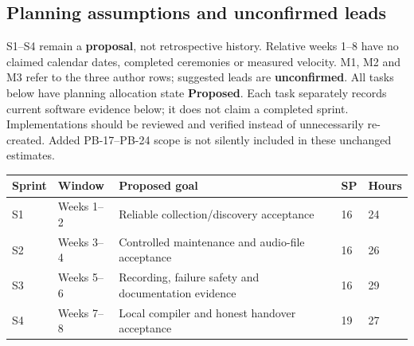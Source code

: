 \documentclass[11pt,a4paper]{article}
\begin{document}
\subsection{Planning assumptions and unconfirmed leads}
S1--S4 remain a \textbf{proposal}, not retrospective history. Relative weeks
1--8 have no claimed calendar dates, completed ceremonies or measured
velocity. M1, M2 and M3 refer to the three author rows;
suggested leads are \textbf{unconfirmed}. All tasks below have planning
allocation state \textbf{Proposed}. Each task separately records current
software evidence below; it does not claim a completed sprint. Implementations should be reviewed and
verified instead of unnecessarily re-created. Added PB-17--PB-24 scope
is not silently included in these unchanged estimates.
\begin{longtable}{L{1.3cm}L{1.8cm}L{7.7cm}L{1cm}L{1.3cm}}
\toprule\textbf{Sprint} & \textbf{Window} & \textbf{Proposed goal} & \textbf{SP} & \textbf{Hours}\\\midrule\endhead
S1 & Weeks 1--2 & Reliable collection/discovery acceptance & 16 & 24\\
S2 & Weeks 3--4 & Controlled maintenance and audio-file acceptance & 16 & 26\\
S3 & Weeks 5--6 & Recording, failure safety and documentation evidence & 16 & 29\\
S4 & Weeks 7--8 & Local compiler and honest handover acceptance & 19 & 27\\
\bottomrule\end{longtable}
\end{document}
